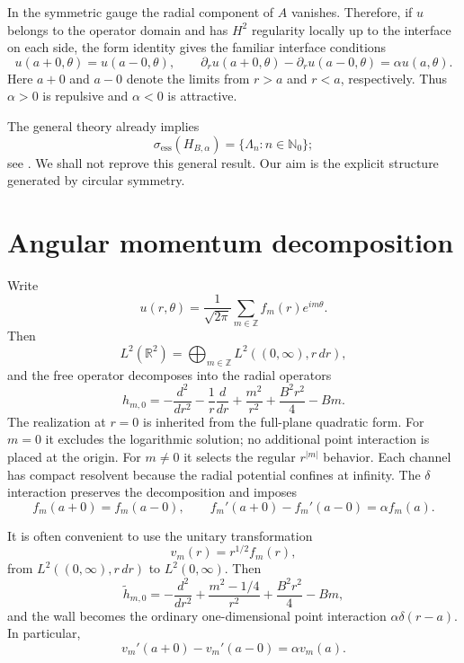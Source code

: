 \documentclass[12pt,a4paper]{article}
\numberwithin{equation}{section}
\theoremstyle{remark}
\theoremstyle{definition}
\newcommand{\R}{\mathbb R}
\newcommand{\N}{\mathbb N}
\newcommand{\spec}{\sigma}
\newcommand{\ess}{\mathrm{ess}}
\begin{document}
In the symmetric gauge the radial component of $A$ vanishes. Therefore, if
$u$ belongs to the operator domain and has $H^2$ regularity locally up to
the interface on each side, the form identity gives the familiar interface
conditions
\begin{equation}\label{eq:interface}
u(a+0,\theta)=u(a-0,\theta),
\qquad
\partial_r u(a+0,\theta)-\partial_r u(a-0,\theta)
=\alpha u(a,\theta).
\end{equation}
Here $a+0$ and $a-0$ denote the limits from $r>a$ and $r<a$, respectively.
Thus $\alpha>0$ is repulsive and $\alpha<0$ is attractive.

The general theory already implies
$$
\spec_{\ess}(H_{B,\alpha})
=\{\Lambda_n:n\in\N_0\};
$$
see \cite{BEHL2020}. We shall not reprove this general result. Our aim is the
explicit structure generated by circular symmetry.

\section{Angular momentum decomposition}\label{sec:angular}

Write
$$
u(r,\theta)
=\frac{1}{\sqrt{2\pi}}
\sum_{m\in\mathbb Z} f_m(r)e^{im\theta}.
$$
Then
$$
L^2(\R^2)
=\bigoplus_{m\in\mathbb Z}L^2((0,\infty),r\,d r),
$$
and the free operator decomposes into the radial operators
\begin{equation}\label{eq:radial-free}
h_{m,0}
=-\frac{d^2}{d r^2}
-\frac{1}{r}\frac{d}{d r}
+\frac{m^2}{r^2}
+\frac{B^2r^2}{4}-Bm.
\end{equation}
The realization at $r=0$ is inherited from the full-plane quadratic
form. For $m=0$ it excludes the logarithmic solution; no additional point
interaction is placed at the origin. For $m\ne0$ it selects the regular
$r^{|m|}$ behavior. Each channel has compact resolvent because the radial
potential confines at infinity. The $\delta$ interaction preserves the
decomposition and imposes
\begin{equation}\label{eq:radial-jump}
f_m(a+0)=f_m(a-0),
\qquad
f_m'(a+0)-f_m'(a-0)=\alpha f_m(a).
\end{equation}

It is often convenient to use the unitary transformation
$$
v_m(r)=r^{1/2}f_m(r),
$$
from $L^2((0,\infty),r\,d r)$ to $L^2(0,\infty)$. Then
\begin{equation}\label{eq:radial-1d}
\widetilde h_{m,0}
=-\frac{d^2}{d r^2}
+\frac{m^2-1/4}{r^2}
+\frac{B^2r^2}{4}-Bm,
\end{equation}
and the wall becomes the ordinary one-dimensional point interaction
$\alpha\delta(r-a)$. In particular,
$$
v_m'(a+0)-v_m'(a-0)=\alpha v_m(a).
$$
\end{document}
